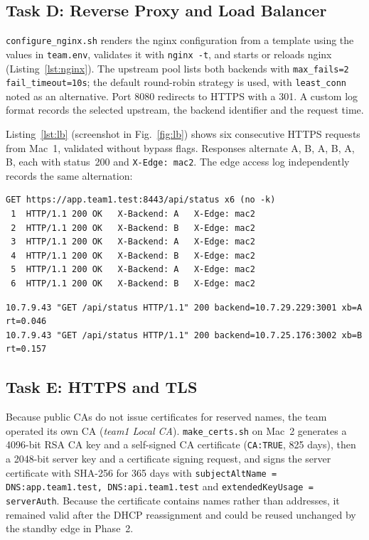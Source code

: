 \documentclass[conference,a4paper]{IEEEtran}
\newcommand{\code}[1]{\texttt{#1}}
\begin{document}
\subsection{Task D: Reverse Proxy and Load Balancer}
\code{configure\_nginx.sh} renders the nginx configuration from a template using the values in
\code{team.env}, validates it with \code{nginx -t}, and starts or reloads nginx
(Listing~\ref{lst:nginx}). The upstream pool lists both backends with
\code{max\_fails=2 fail\_timeout=10s}; the default round-robin strategy is used, with
\code{least\_conn} noted as an alternative. Port 8080 redirects to HTTPS with a 301. A custom log
format records the selected upstream, the backend identifier and the request time.

Listing~\ref{lst:lb} (screenshot in Fig.~\ref{fig:lb}) shows six consecutive HTTPS requests from
Mac~1, validated without bypass flags. Responses alternate A, B, A, B, A, B, each with status~200
and \code{X-Edge: mac2}. The edge access log independently records the same alternation:
\begin{lstlisting}[caption={Load-balancing gate from Mac 1 (demo\_lb.sh)},label={lst:lb}]
GET https://app.team1.test:8443/api/status x6 (no -k)
 1  HTTP/1.1 200 OK   X-Backend: A   X-Edge: mac2
 2  HTTP/1.1 200 OK   X-Backend: B   X-Edge: mac2
 3  HTTP/1.1 200 OK   X-Backend: A   X-Edge: mac2
 4  HTTP/1.1 200 OK   X-Backend: B   X-Edge: mac2
 5  HTTP/1.1 200 OK   X-Backend: A   X-Edge: mac2
 6  HTTP/1.1 200 OK   X-Backend: B   X-Edge: mac2
\end{lstlisting}
\begin{lstlisting}[caption={Edge access log on Mac 2 (custom format)},label={lst:access}]
10.7.9.43 "GET /api/status HTTP/1.1" 200 backend=10.7.29.229:3001 xb=A rt=0.046
10.7.9.43 "GET /api/status HTTP/1.1" 200 backend=10.7.25.176:3002 xb=B rt=0.157
\end{lstlisting}

\subsection{Task E: HTTPS and TLS}
Because public CAs do not issue certificates for reserved names, the team operated its own CA
(\emph{team1 Local CA}). \code{make\_certs.sh} on Mac~2 generates a 4096-bit RSA CA key and a
self-signed CA certificate (\code{CA:TRUE}, 825 days), then a 2048-bit server key and a
certificate signing request, and signs the server certificate with SHA-256 for 365 days with
\code{subjectAltName = DNS:app.team1.test, DNS:api.team1.test} and
\code{extendedKeyUsage = serverAuth}. Because the certificate contains names rather than
addresses, it remained valid after the DHCP reassignment and could be reused unchanged by the
standby edge in Phase~2.
\end{document}

